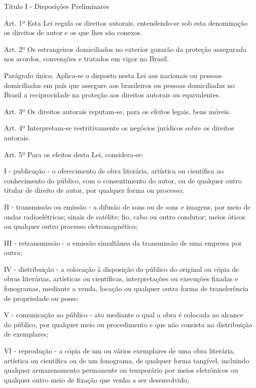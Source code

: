 \begin{center}
Título I - Disposições Preliminares
\end{center}

\scriptsize{
Art. 1º Esta Lei regula os direitos autorais, entendendo-se sob esta denominação os direitos de autor e os que lhes são conexos. 

Art. 2º Os estrangeiros domiciliados no exterior gozarão da proteção assegurada nos acordos, convenções e tratados em vigor no Brasil.

Parágrafo único. Aplica-se o disposto nesta Lei aos nacionais ou pessoas domiciliadas em país que assegure aos brasileiros ou pessoas domiciliadas no Brasil a reciprocidade na proteção aos direitos autorais ou equivalentes.

Art. 3º Os direitos autorais reputam-se, para os efeitos legais, bens móveis.

Art. 4º Interpretam-se restritivamente os negócios jurídicos sobre os direitos autorais.

Art. 5º Para os efeitos desta Lei, considera-se:

I - publicação - o oferecimento de obra literária, artística ou científica ao conhecimento do público, com o consentimento do autor, ou de qualquer outro titular de direito de autor, por qualquer forma ou processo;

II - transmissão ou emissão - a difusão de sons ou de sons e imagens, por meio de ondas radioelétricas; sinais de satélite; fio, cabo ou outro condutor; meios óticos ou qualquer outro processo eletromagnético; 

III - retransmissão - a emissão simultânea da transmissão de uma empresa por outra;

IV - distribuição - a colocação à disposição do público do original ou cópia de obras literárias, artísticas ou científicas, interpretações ou execuções fixadas e fonogramas, mediante a venda, locação ou qualquer outra forma de transferência de propriedade ou posse;

V - comunicação ao público - ato mediante o qual a obra é colocada ao alcance do público, por qualquer meio ou procedimento e que não consista na distribuição de exemplares;

VI - reprodução - a cópia de um ou vários exemplares de uma obra literária, artística ou científica ou de um fonograma, de qualquer forma tangível, incluindo qualquer armazenamento permanente ou temporário por meios eletrônicos ou qualquer outro meio de fixação que venha a ser desenvolvido;

}
